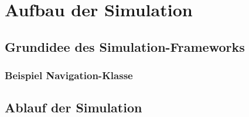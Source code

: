 \chapter{Aufbau der Simulation}
\section{Grundidee des Simulation-Frameworks}
\subsection{Beispiel Navigation-Klasse }
\section{Ablauf der Simulation}
